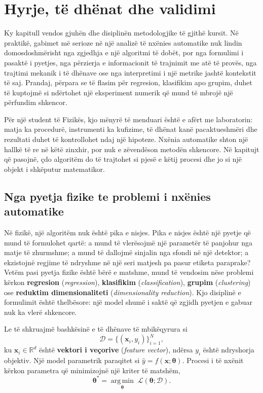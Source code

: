 \documentclass[12pt,a4paper,oneside]{book}
\newcommand{\term}[2]{\textbf{#1} (\textit{#2})}
\newcommand{\R}{\mathbb{R}}
\newcommand{\argmin}{\operatorname*{arg\,min}}
\begin{document}
\mainmatter
\chapter[Hyrje dhe validimi]{Hyrje, të dhënat dhe validimi}

Ky kapitull vendos gjuhën dhe disiplinën metodologjike të gjithë kursit. Në praktikë, gabimet më serioze në një analizë të nxënies automatike nuk lindin domosdoshmërisht nga zgjedhja e një algoritmi të dobët, por nga formulimi i pasaktë i pyetjes, nga përzierja e informacionit të trajnimit me atë të provës, nga trajtimi mekanik i të dhënave ose nga interpretimi i një metrike jashtë kontekstit të saj. Prandaj, përpara se të flasim për regresion, klasifikim apo grupim, duhet të kuptojmë si ndërtohet një eksperiment numerik që mund të mbrojë një përfundim shkencor.

Për një student të Fizikës, kjo mënyrë të menduari është e afërt me laboratorin: matja ka procedurë, instrumenti ka kufizime, të dhënat kanë pacaktueshmëri dhe rezultati duhet të kontrollohet ndaj një hipoteze. Nxënia automatike shton një hallkë të re në këtë zinxhir, por nuk e zëvendëson metodën shkencore. Në kapitujt që pasojnë, çdo algoritëm do të trajtohet si pjesë e këtij procesi dhe jo si një objekt i shkëputur matematikor.
\section{Nga pyetja fizike te problemi i nxënies automatike}

Në fizikë, një algoritëm nuk është pika e nisjes. Pika e nisjes është një pyetje që mund të formulohet qartë: a mund të vlerësojmë një parametër të panjohur nga matje të zhurmshme; a mund të dallojmë sinjalin nga sfondi në një detektor; a ekzistojnë regjime të ndryshme në një seri matjesh pa pasur etiketa paraprake? Vetëm pasi pyetja fizike është bërë e matshme, mund të vendosim nëse problemi kërkon \term{regresion}{regression}, \term{klasifikim}{classification}, \term{grupim}{clustering} ose \term{reduktim dimensionaliteti}{dimensionality reduction}. Kjo disiplinë e formulimit është thelbësore: një model shumë i saktë që zgjidh pyetjen e gabuar nuk ka vlerë shkencore.

Le të shkruajmë bashkësinë e të dhënave të mbikëqyrura si
\[
\mathcal D=\{(\mathbf{x}_i,y_i)\}_{i=1}^{N},
\]
ku $\mathbf{x}_i\in\R^d$ është \term{vektori i veçorive}{feature vector}, ndërsa $y_i$ është ndryshorja objektiv. Një model parametrik paraqitet si $\hat y=f(\mathbf{x};\boldsymbol\theta)$. Procesi i të nxënit kërkon parametra që minimizojnë një kriter të matshëm,
\[
\boldsymbol\theta^*=\argmin_{\boldsymbol\theta}\;\mathcal L(\boldsymbol\theta;\mathcal D).
\]
\end{document}
